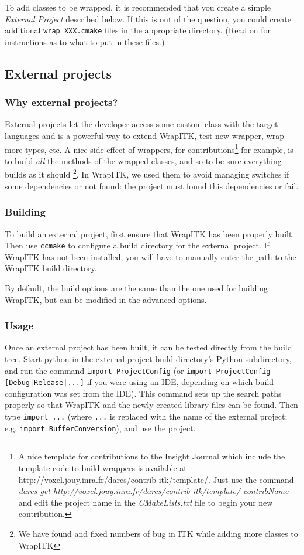 \documentclass{InsightArticle}
\begin{document}
To add classes to be wrapped, it is recommended that you create a simple
{\em External Project} described below. If this is out of the question, you could
create additional \verb$wrap_XXX.cmake$ files in the appropriate directory. (Read on
for instructions as to what to put in these files.)


  \subsection{External projects}

    \subsubsection{Why external projects?}

External projects let the developer access some custom class with the target languages
and is a powerful way to extend WrapITK, test new wrapper, wrap more types, etc.
A nice side effect of wrappers, for contributions\footnote{A nice template for
contributions to the Insight Journal \cite{InsightJournalWebSite} which include the 
template code to build wrappers is available at
\url{http://voxel.jouy.inra.fr/darcs/contrib-itk/template/}. Just use the command
{\em darcs get http://voxel.jouy.inra.fr/darcs/contrib-itk/template/ contribName}
and edit the project name in the {\em CMakeLists.txt} file to
begin your new contribution.} for example, is to build {\em all}
the methods of the wrapped classes, and so to be sure everything builds as it should
\footnote{We have found and fixed numbers of bug in ITK while adding
more classes to WrapITK}.
In WrapITK, we used them to avoid managing switches if some dependencies or not
found: the project must found this dependencies or fail.


    \subsubsection{Building}
To build an external project, first ensure that WrapITK has been properly built.
Then use \verb$ccmake$ to configure a build directory for the external project. If
WrapITK has not been installed, you will have to manually enter the path to the
WrapITK build directory.

By default, the build options are the same than the one used for building WrapITK,
but can be modified in the advanced options.

    \subsubsection{Usage}
Once an external project has been built, it can be tested directly from the
build tree. Start python in the external project build directory's Python
subdirectory, and run the command \verb$import ProjectConfig$ (or 
\verb$import ProjectConfig-[Debug|Release|...]$ if you were using an IDE, depending on which
build configuration was set from the IDE). This command sets up the search paths
properly so that WrapITK and the newly-created library files can be found. Then
type \verb$import ...$ (where \verb$...$ is replaced with the name of the external
project; e.g. \verb$import BufferConversion$), and use the project.
\end{document}
